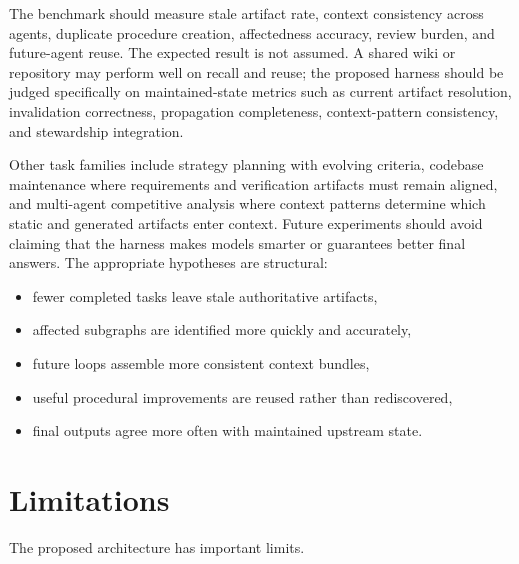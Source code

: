 \documentclass{article}
\begin{document}
The benchmark should measure stale artifact rate, context consistency across agents, duplicate procedure creation, affectedness accuracy, review burden, and future-agent reuse. The expected result is not assumed. A shared wiki or repository may perform well on recall and reuse; the proposed harness should be judged specifically on maintained-state metrics such as current artifact resolution, invalidation correctness, propagation completeness, context-pattern consistency, and stewardship integration.

Other task families include strategy planning with evolving criteria, codebase maintenance where requirements and verification artifacts must remain aligned, and multi-agent competitive analysis where context patterns determine which static and generated artifacts enter context. Future experiments should avoid claiming that the harness makes models smarter or guarantees better final answers. The appropriate hypotheses are structural:
\begin{itemize}[leftmargin=*]
\item fewer completed tasks leave stale authoritative artifacts,
\item affected subgraphs are identified more quickly and accurately,
\item future loops assemble more consistent context bundles,
\item useful procedural improvements are reused rather than rediscovered,
\item final outputs agree more often with maintained upstream state.
\end{itemize}

\section{Limitations}

The proposed architecture has important limits.
\end{document}
